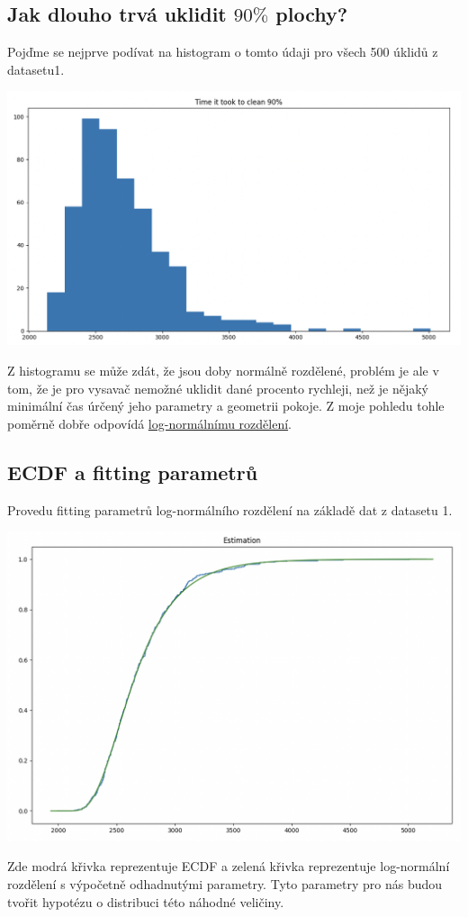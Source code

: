 \documentclass[11pt]{article}
\begin{document}
\subsection{Jak dlouho trvá uklidit $90\%$ plochy?}
Pojďme se nejprve podívat na histogram o tomto údaji pro všech 500 úklidů z datasetu1.
\begin{center}
	\includegraphics[scale=0.4]{Images/HistogramDataset.png}
\end{center}
Z histogramu se může zdát, že jsou doby normálně rozdělené, problém je ale v tom, že je pro vysavač nemožné uklidit dané procento rychleji, než je nějaký minimální čas úrčený jeho parametry a geometrii pokoje. Z moje pohledu tohle poměrně dobře odpovídá \href{https://en.wikipedia.org/wiki/Log-normal_distribution}{log-normálnímu rozdělení}.
\subsection{ECDF a fitting parametrů}
Provedu fitting parametrů log-normálního rozdělení na základě dat z datasetu 1.
\begin{center}
	\includegraphics[scale=0.3]{Images/EstimationCDF.png}
\end{center}
Zde modrá křivka reprezentuje ECDF a zelená křivka reprezentuje log-normální rozdělení s výpočetně odhadnutými parametry. Tyto parametry pro nás budou tvořit hypotézu o distribuci této náhodné veličiny.
\end{document}
